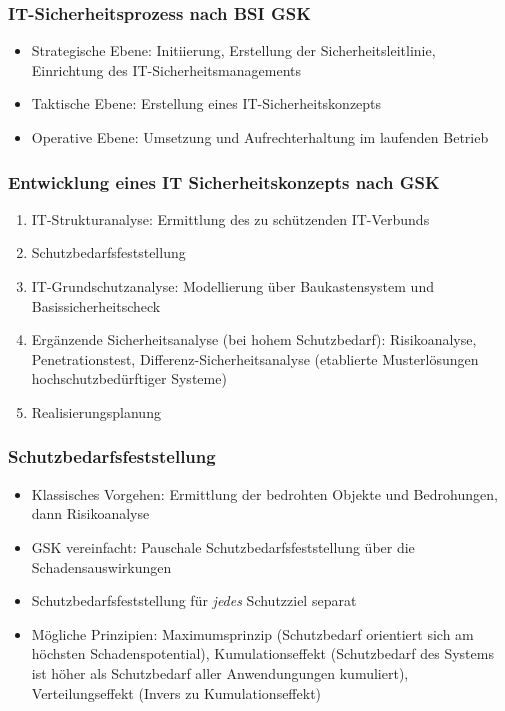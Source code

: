 \subsubsection{IT-Sicherheitsprozess nach BSI GSK}
\begin{itemize}
	\item Strategische Ebene: Initiierung, Erstellung der Sicherheitsleitlinie, Einrichtung des IT-Sicherheitsmanagements
	\item Taktische Ebene: Erstellung eines IT-Sicherheitskonzepts
	\item Operative Ebene: Umsetzung und Aufrechterhaltung im laufenden Betrieb
\end{itemize}

\subsubsection{Entwicklung eines IT Sicherheitskonzepts nach GSK}
\begin{enumerate}
	\item IT-Strukturanalyse: Ermittlung des zu schützenden IT-Verbunds
	\item Schutzbedarfsfeststellung
	\item IT-Grundschutzanalyse: Modellierung über Baukastensystem und Basissicherheitscheck
	\item Ergänzende Sicherheitsanalyse (bei hohem Schutzbedarf): Risikoanalyse, Penetrationstest, Differenz-Sicherheitsanalyse (etablierte Musterlösungen hochschutzbedürftiger Systeme)
	\item Realisierungsplanung
\end{enumerate}

\subsubsection{Schutzbedarfsfeststellung}
\begin{itemize}
	\item Klassisches Vorgehen: Ermittlung der bedrohten Objekte und Bedrohungen, dann Risikoanalyse
	\item GSK vereinfacht: Pauschale Schutzbedarfsfeststellung über die Schadensauswirkungen
	\item Schutzbedarfsfeststellung für \textit{jedes} Schutzziel separat
	\item Mögliche Prinzipien: Maximumsprinzip (Schutzbedarf orientiert sich am höchsten Schadenspotential), Kumulationseffekt (Schutzbedarf des Systems ist höher als Schutzbedarf aller Anwendungungen kumuliert), Verteilungseffekt (Invers zu Kumulationseffekt)
\end{itemize}

